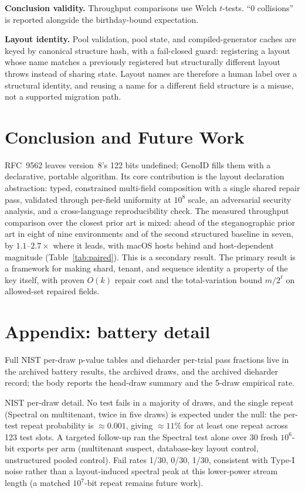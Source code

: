 \documentclass{svproc}
\begin{document}
\textbf{Conclusion validity.} Throughput comparisons use Welch $t$-tests. ``0 collisions'' is reported alongside the birthday-bound expectation.

\textbf{Layout identity.} Pool validation, pool state, and compiled-generator caches are keyed by canonical structure hash, with a fail-closed guard: registering a layout whose name matches a previously registered but structurally different layout throws instead of sharing state. Layout names are therefore a human label over a structural identity, and reusing a name for a different field structure is a misuse, not a supported migration path.



\section{Conclusion and Future Work}
\label{sec:conclusion}
RFC~9562 leaves version~8's 122 bits undefined; GenoID fills them with a declarative, portable algorithm. Its core contribution is the layout declaration abstraction: typed, constrained multi-field composition with a single shared repair pass, validated through per-field uniformity at $10^8$ scale, an adversarial security analysis, and a cross-language reproducibility check. The measured throughput comparison over the closest prior art is mixed: ahead of the steganographic prior art in eight of nine environments and of the second structured baseline in seven, by $1.1$--$2.7\times$ where it leads, with macOS hosts behind and host-dependent magnitude (Table~\ref{tab:paired}). This is a secondary result. The primary result is a framework for making shard, tenant, and sequence identity a property of the key itself, with proven $O(k)$ repair cost and the total-variation bound $m/2^\ell$ on allowed-set repaired fields.

\section*{Appendix: battery detail}
Full NIST per-draw p-value tables and dieharder per-trial pass fractions live in the archived battery results, the archived draws, and the archived dieharder record; the body reports the head-draw summary and the 5-draw empirical rate.

NIST per-draw detail. No test fails in a majority of draws, and the single repeat (Spectral on multitenant, twice in five draws) is expected under the null: the per-test repeat probability is $\approx 0.001$, giving $\approx 11\%$ for at least one repeat across 123 test slots. A targeted follow-up ran the Spectral test alone over 30 fresh $10^6$-bit exports per arm (multitenant suspect, database-key layout control, unstructured pooled control). Fail rates 1/30, 0/30, 1/30, consistent with Type-I noise rather than a layout-induced spectral peak at this lower-power stream length (a matched $10^7$-bit repeat remains future work).
\end{document}
